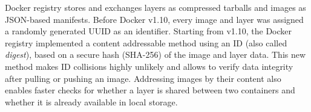 Docker registry stores and exchanges layers as compressed tarballs and images
as JSON-based manifests.
%
Before Docker v1.10, every image and layer was assigned a randomly generated UUID
as an identifier.
%
%
Starting from v1.10, the Docker registry implemented a content addressable method
using an ID (also called \emph{digest}), based on a secure hash (SHA-256) of the
image and layer data.
%
%
This new method makes ID collisions highly unlikely and allows to verify data
integrity after pulling or pushing an image.
%
%
%
%
Addressing images by their content also enables faster checks for whether a
layer is shared between two containers and whether it is already available
in local storage.
%
%






